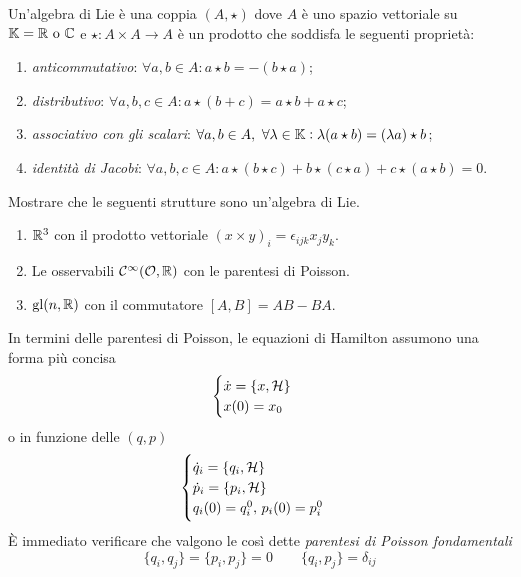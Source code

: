 \begin{definition}
    Un'algebra di Lie è una coppia $ (A, \star) $ dove $ A $ è uno spazio vettoriale su $ \mathbb{K} = \mathbb{R} \text{ o } \mathbb{C} $ e $ \star \colon A \times A \to A $ è un prodotto che soddisfa le seguenti proprietà:
    \begin{enumerate}[label=(\roman*)]
        \item \emph{anticommutativo}: $ \forall a, b \in A : a \star b = - (b \star a) $;
        \item \emph{distributivo}: $ \forall a, b, c \in A : a \star (b + c) = a \star b + a \star c $;
        \item \emph{associativo con gli scalari}: $ \forall a, b \in A, \ \forall \lambda \in \mathbb{K} : \lambda (a \star b) = (\lambda a) \star b $;
        \item \emph{identità di Jacobi}: $ \forall a, b, c \in A : a \star (b \star c) + b \star (c \star a) + c \star (a \star b) = 0 $.
    \end{enumerate}
\end{definition}

\begin{exercise}
    Mostrare che le seguenti strutture sono un'algebra di Lie.
    \begin{enumerate}
        \item $ \mathbb{R}^3 $ con il prodotto vettoriale $ (x \times y)_i = \epsilon_{ijk} x_j y_k $.
        \item Le osservabili $ \mathcal{C}^\infty(\mathcal{O}, \mathbb{R}) $ con le parentesi di Poisson.
        \item $ \mathrm{gl}(n, \mathbb{R}) $ con il commutatore $ [A, B] = AB - BA $.
    \end{enumerate}
\end{exercise}

In termini delle parentesi di Poisson, le equazioni di Hamilton assumono una forma più concisa
\begin{equation}
    \begin{cases}
        \dot{x} = \{x, \mathcal{H}\} \\
        x(0) = x_0
    \end{cases}
\end{equation}
o in funzione delle $ (q, p) $
\begin{equation}
    \begin{cases}
    \dot{q}_i = \{q_i, \mathcal{H}\} \\
    \dot{p}_i = \{p_i, \mathcal{H}\} \\
    q_i(0) = q_i^0, \, p_i(0) = p_i^0
    \end{cases}
\end{equation}
È immediato verificare che valgono le così dette \emph{parentesi di Poisson fondamentali}
\begin{equation}
    \{q_i, q_j\} = \{p_i, p_j\} = 0 \qquad \{q_i, p_j\} = \delta_{ij}
\end{equation}


